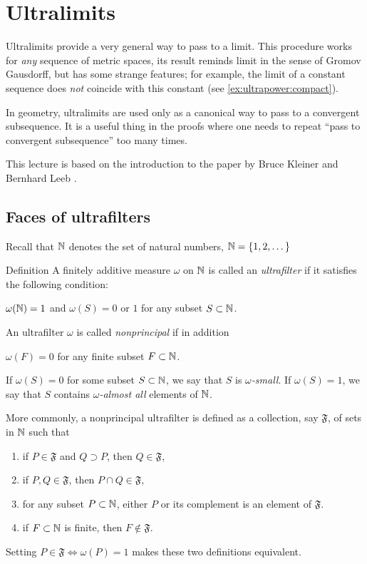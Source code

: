 \chapter{Ultralimits}

Ultralimits provide a very general way to pass to a limit.
This procedure works for \emph{any} sequence of metric spaces, its result reminds limit in the sense of Gromov Gausdorff, but has some strange features; for example, the limit of a constant sequence does \emph{not} coincide with this constant (see \ref{ex:ultrapower:compact}).

In geometry, ultralimits are used only as a canonical way to pass to a convergent subsequence.
It is a useful thing in the proofs where one needs to repeat ``pass to convergent subsequence'' too many times.

This lecture is based on the introduction to the paper by Bruce Kleiner and Bernhard Leeb \cite{kleiner-leeb}.

\section{Faces of ultrafilters}

Recall that $\mathbb{N}$ denotes the set of natural numbers, $\mathbb{N}=\{1,2,\dots\}$

\begin{thm}{Definition}
A finitely additive measure $\omega$ 
on  $\mathbb{N}$ 
is called an \emph{ultrafilter} if it satisfies the following condition:
\begin{subthm}{}
$\omega(\mathbb{N})=1$ and 
$\omega(S)=0$ or $1$ for any subset $S\subset \mathbb{N}$.
\end{subthm}
An ultrafilter $\omega$ is called 
\emph{nonprincipal} if in addition 
\begin{subthm}{}
$\omega(F)=0$ for any finite subset $F\subset \mathbb{N}$.
\end{subthm}
\end{thm}

If $\omega(S)=0$ for some subset $S\subset \mathbb{N}$,
we say that $S$ is \emph{$\omega$-small}. 
If $\omega(S)=1$, we say that $S$ contains \emph{$\omega$-almost all} elements of $\mathbb{N}$.

More commonly, a nonprincipal ultrafilter is defined as a collection, say $\mathfrak{F}$, of sets in $\mathbb{N}$ such that
\begin{enumerate}
\item\label{filter:supset} if $P\in \mathfrak{F}$ and $Q\supset P$, then $Q\in \mathfrak{F}$,
\item\label{filter:cap} if $P, Q\in \mathfrak{F}$, then $P\cap Q\in \mathfrak{F}$,
\item\label{filter:ultra} for any subset $P\subset\mathbb{N}$, either $P$ or its complement is an element of $\mathfrak{F}$.
\item\label{filter:non-prin} if $F\subset \mathbb{N} $ is finite, then $F\notin \mathfrak{F}$.
\end{enumerate}
Setting $P\in\mathfrak{F}\Leftrightarrow\omega(P)=1$ makes these two definitions equivalent.

